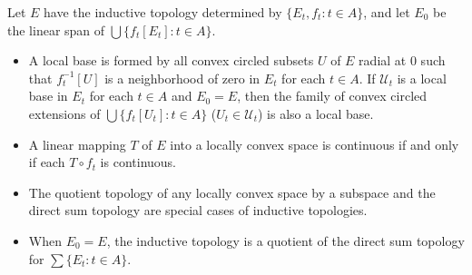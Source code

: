 Let $E$ have the inductive topology determined by $\{E_t, f_t : t \in A\}$, and let $E_0$ be the linear span of $\bigcup \{f_t[E_t] : t \in A\}$.

\begin{itemize}
\item[(c)] A local base is formed by all convex circled subsets $U$ of $E$ radial at $0$ such that $f_t^{-1}[U]$ is a neighborhood of zero in $E_t$ for each $t \in A$. If $\mathcal{U}_t$ is a local base in $E_t$ for each $t \in A$ and $E_0 = E$, then the family of convex circled extensions of $\bigcup \{f_t[U_t] : t \in A\}$ ($U_t \in \mathcal{U}_t$) is also a local base.

\item[(d)] A linear mapping $T$ of $E$ into a locally convex space is continuous if and only if each $T \circ f_t$ is continuous.

\item[(e)] The quotient topology of any locally convex space by a subspace and the direct sum topology are special cases of inductive topologies.

\item[(f)] When $E_0 = E$, the inductive topology is a quotient of the direct sum topology for $\sum \{E_t : t \in A\}$.
\end{itemize}
